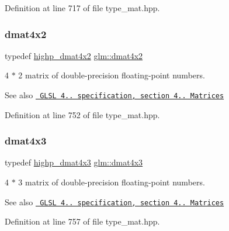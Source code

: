 Definition at line 717 of file type\+\_\+mat.\+hpp.

\mbox{\label{group__core__types_gab3d51ce41e6f0aa267d3e185cee09c44}} 
\subsubsection{\texorpdfstring{dmat4x2}{dmat4x2}}
{\footnotesize\ttfamily typedef \mbox{\hyperlink{group__core__precision_gaa0a2369be2e3d5a4db98cae345413dc1}{highp\+\_\+dmat4x2}} \mbox{\hyperlink{group__core__types_gab3d51ce41e6f0aa267d3e185cee09c44}{glm\+::dmat4x2}}}

4 $\ast$ 2 matrix of double-\/precision floating-\/point numbers.

\begin{DoxySeeAlso}{See also}
\href{http://www.opengl.org/registry/doc/GLSLangSpec.4.20.8.pdf}{\texttt{ G\+L\+SL 4.. specification, section 4.. Matrices}} 
\end{DoxySeeAlso}


Definition at line 752 of file type\+\_\+mat.\+hpp.

\mbox{\label{group__core__types_gaa4a157ac183c5bd5dcbd555a94b1b505}} 
\subsubsection{\texorpdfstring{dmat4x3}{dmat4x3}}
{\footnotesize\ttfamily typedef \mbox{\hyperlink{group__core__precision_gaec00d802f271a807485a0069cdb5ea05}{highp\+\_\+dmat4x3}} \mbox{\hyperlink{group__core__types_gaa4a157ac183c5bd5dcbd555a94b1b505}{glm\+::dmat4x3}}}

4 $\ast$ 3 matrix of double-\/precision floating-\/point numbers.

\begin{DoxySeeAlso}{See also}
\href{http://www.opengl.org/registry/doc/GLSLangSpec.4.20.8.pdf}{\texttt{ G\+L\+SL 4.. specification, section 4.. Matrices}} 
\end{DoxySeeAlso}


Definition at line 757 of file type\+\_\+mat.\+hpp.

\mbox{\label{group__core__types_ga54d90d4b902d93638b906571af215bb1}} 

